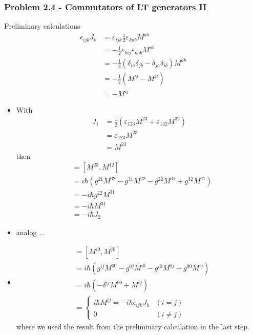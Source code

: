 \documentclass[10pt,a4paper]{article}
\theoremstyle{definition}
\begin{document}
\subsubsection{Problem 2.4 - Commutators of LT generators II}
Preliminary calculations
\begin{align}
\epsilon_{ijk}J_k
&=\varepsilon_{ijk}\frac{1}{2}\varepsilon_{kab}M^{ab}\\
&=-\frac{1}{2}\varepsilon_{kij}\varepsilon_{kab}M^{ab}\\
&=-\frac{1}{2}\left(\delta_{ia}\delta_{jb}-\delta_{ja}\delta_{ib}\right)M^{ab}\\
&=-\frac{1}{2}\left(M^{ij}-M^{ji}\right)\\
&=-M^{ij}
\end{align}
\begin{itemize}
\item  With
\begin{align}
J_1
&=\frac{1}{2}(\varepsilon_{123}M^{23}+\varepsilon_{132}M^{32})\\
&=\varepsilon_{123}M^{23}\\
&=M^{23}
\end{align}
then
\begin{align}
[J_1,J_3]
&=[M^{23},M^{12}]\\
&=i\hbar\left(g^{21}M^{32}-g^{31}M^{22}-g^{22}M^{31}+g^{32}M^{21}\right)\\
&=-i\hbar g^{22}M^{31}\\
&=-i\hbar M^{31}\\
&=-i\hbar J_2
\end{align}
\item analog ...
\item
\begin{align}
[K^i,K^j]
&=[M^{i0},M^{j0}]\\
&=i\hbar\left(g^{ij}M^{00}-g^{0j}M^{i0}-g^{i0}M^{0j}+g^{00}M^{ij}\right)\\
&=i\hbar\left(-\delta^{ij}M^{00}+M^{ij}\right) \\
&=\left\{
\begin{array}{ll} 
i\hbar M^{ij}=-i\hbar\epsilon_{ijk}J_k 	& (i=j)\\
 0 										& (i\neq j)
\end{array}\right.
\end{align}
where we used the result from the preliminary calculation in the last step.
\end{itemize}
\end{document}
